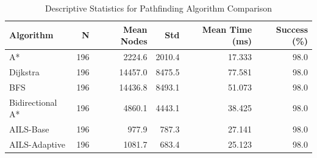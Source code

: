 
\begin{table}[htbp]
\centering
\caption{Descriptive Statistics for Pathfinding Algorithm Comparison}
\label{tab:descriptive_stats}
\begin{tabular}{lrrrrr}
\toprule
\textbf{Algorithm} & \textbf{N} & \textbf{Mean Nodes} & \textbf{Std} & \textbf{Mean Time (ms)} & \textbf{Success (\%)} \\
\midrule
A* & 196 & 2224.6 & 2010.4 & 17.333 & 98.0 \\
Dijkstra & 196 & 14457.0 & 8475.5 & 77.581 & 98.0 \\
BFS & 196 & 14436.8 & 8493.1 & 51.073 & 98.0 \\
Bidirectional A* & 196 & 4860.1 & 4443.1 & 38.425 & 98.0 \\
AILS-Base & 196 & 977.9 & 787.3 & 27.141 & 98.0 \\
AILS-Adaptive & 196 & 1081.7 & 683.4 & 25.123 & 98.0 \\

\bottomrule
\end{tabular}
\end{table}
